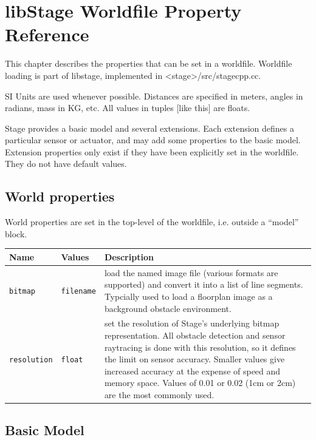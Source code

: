 \documentclass[letter,11pt,twoside]{report}
\begin{document}
\chapter{libStage Worldfile Property Reference}
\label{chap:propref}

This chapter describes the properties that can be set in a
worldfile. Worldfile loading is part of libstage, implemented in
<stage>/src/stagecpp.cc.

SI Units are used whenever possible. Distances are specified in
meters, angles in radians, mass in KG, etc. All values in tuples [like
this] are floats.

Stage provides a basic model and several extensions. Each extension
defines a particular sensor or actuator, and may add some properties
to the basic model. Extension properties only exist if they have
been explicitly set in the worldfile. They do not have default values.

\section{World properties}

World properties are set in the top-level of the worldfile,
i.e. outside a ``model'' block.

\begin{tabularx}{\columnwidth}{llX}
\hline
Name & Values & Description \\
\hline

\verb'bitmap' & \verb'filename' & load the named image file (various
formats are supported) and convert it into a list of line
segments. Typcially used to load a floorplan image as a background obstacle environment.\\

\verb'resolution' & \verb'float' & set the resolution of Stage's
underlying bitmap representation. All obstacle detection and sensor
raytracing is done with this resolution, so it defines the limit on
sensor accuracy. Smaller values give increased accuracy at the expense
of speed and memory space. Values of 0.01 or 0.02 (1cm or 2cm) are the
most commonly used. \\

\end{tabularx}



\newpage
\section{Basic Model}
\end{document}
